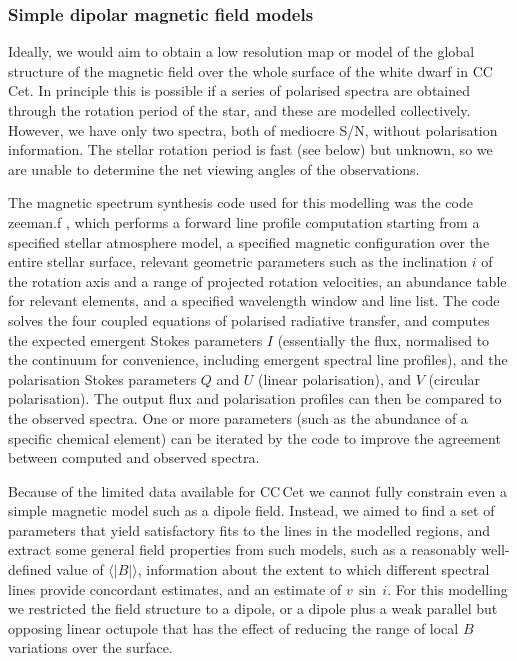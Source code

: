 \documentclass[fleqn,usenatbib]{mnras}
\newcommand{\bs}{\ensuremath{\langle \vert B \vert \rangle}}
\newcommand{\vsini}{\ensuremath{v\,\sin\,i}}
\begin{document}
\subsubsection{Simple dipolar magnetic field models}

Ideally, we would aim to obtain a low resolution map or model of the global structure of the magnetic field over the whole surface of the white dwarf in CC\,Cet. In principle this is possible if a series of polarised spectra are obtained through the rotation period of the star, and these are modelled collectively. However, we have only two spectra, both of mediocre S/N, without polarisation information. The stellar rotation period is fast (see below) but unknown, so we are unable to determine the net viewing angles of the observations. 

The magnetic spectrum synthesis code used for this modelling was the code {\sc zeeman.f} \citep{landstreet88-1}, which performs a forward line profile computation starting from a specified stellar atmosphere model, a specified magnetic configuration over the entire stellar surface, relevant geometric parameters such as the inclination $i$ of the rotation axis and a range of projected rotation velocities, an abundance table for relevant elements, and a specified wavelength window and line list.  The code solves the four coupled equations of polarised radiative transfer, and computes the expected emergent Stokes parameters $I$ (essentially the flux, normalised to the continuum for convenience, including emergent spectral line profiles), and the polarisation Stokes parameters $Q$ and $U$ (linear polarisation), and $V$ (circular polarisation). The output flux and polarisation profiles can then be compared to the observed spectra. One or more parameters (such as the abundance of a specific chemical element) can be iterated by the code to improve the agreement between computed and observed spectra.

Because of the limited data available for CC\,Cet we cannot fully constrain even a simple magnetic model such as a dipole field. Instead, we aimed to find a set of parameters that yield satisfactory fits to the lines in the modelled regions, and extract some general field properties from such models, such as a reasonably well-defined value of \bs, information about the extent to which different spectral lines provide concordant estimates, and an estimate of \vsini. For this modelling we restricted the field structure to a dipole, or a dipole plus a weak parallel but opposing linear octupole that has the effect of reducing the range of local $B$ variations over the surface.
\end{document}
